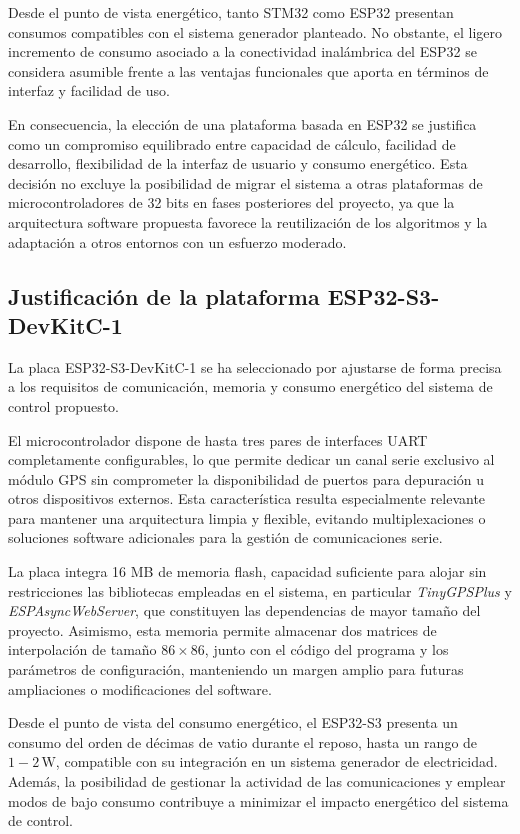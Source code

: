Desde el punto de vista energético, tanto STM32 como ESP32 presentan consumos compatibles con el sistema generador planteado. No obstante, el ligero incremento de consumo asociado a la conectividad inalámbrica del ESP32 se considera asumible frente a las ventajas funcionales que aporta en términos de interfaz y facilidad de uso.

En consecuencia, la elección de una plataforma basada en ESP32 se justifica como un compromiso equilibrado entre capacidad de cálculo, facilidad de desarrollo, flexibilidad de la interfaz de usuario y consumo energético. Esta decisión no excluye la posibilidad de migrar el sistema a otras plataformas de microcontroladores de 32 bits en fases posteriores del proyecto, ya que la arquitectura software propuesta favorece la reutilización de los algoritmos y la adaptación a otros entornos con un esfuerzo moderado.

\subsection{Justificación de la plataforma ESP32-S3-DevKitC-1}

La placa ESP32-S3-DevKitC-1 se ha seleccionado por ajustarse de forma precisa a los requisitos de comunicación, memoria y consumo energético del sistema de control propuesto. 

El microcontrolador dispone de hasta tres pares de interfaces UART completamente configurables, lo que permite dedicar un canal serie exclusivo al módulo GPS sin comprometer la disponibilidad de puertos para depuración u otros dispositivos externos. Esta característica resulta especialmente relevante para mantener una arquitectura limpia y flexible, evitando multiplexaciones o soluciones software adicionales para la gestión de comunicaciones serie.

La placa integra 16 MB de memoria flash, capacidad suficiente para alojar sin restricciones las bibliotecas empleadas en el sistema, en particular \textit{TinyGPSPlus} y \textit{ESPAsyncWebServer}, que constituyen las dependencias de mayor tamaño del proyecto. Asimismo, esta memoria permite almacenar dos matrices de interpolación de tamaño $86\times 86$, junto con el código del programa y los parámetros de configuración, manteniendo un margen amplio para futuras ampliaciones o modificaciones del software.

Desde el punto de vista del consumo energético, el ESP32-S3 presenta un consumo del orden de décimas de vatio durante el reposo, hasta un rango de $1-2 \, \mathrm{W}$, compatible con su integración en un sistema generador de electricidad. Además, la posibilidad de gestionar la actividad de las comunicaciones y emplear modos de bajo consumo contribuye a minimizar el impacto energético del sistema de control.

